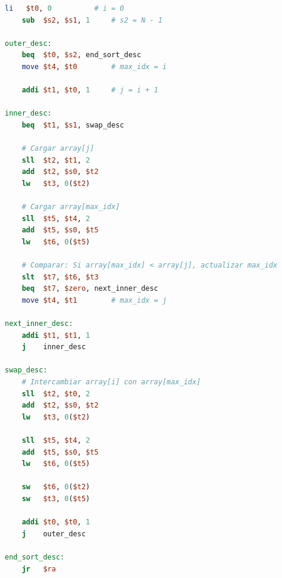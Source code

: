 \documentclass[12pt,a4paper]{article}
\begin{document}
\begin{lstlisting}[language=MIPS, caption={Programa en MIPS para almacenamiento, impresión y ordenamiento ascendente/descendente de un arreglo de 8 enteros.}, label={lst:mips_code}]
    li   $t0, 0          # i = 0
    sub  $s2, $s1, 1     # s2 = N - 1

outer_desc:
    beq  $t0, $s2, end_sort_desc
    move $t4, $t0        # max_idx = i

    addi $t1, $t0, 1     # j = i + 1

inner_desc:
    beq  $t1, $s1, swap_desc

    # Cargar array[j]
    sll  $t2, $t1, 2
    add  $t2, $s0, $t2
    lw   $t3, 0($t2)

    # Cargar array[max_idx]
    sll  $t5, $t4, 2
    add  $t5, $s0, $t5
    lw   $t6, 0($t5)

    # Comparar: Si array[max_idx] < array[j], actualizar max_idx
    slt  $t7, $t6, $t3
    beq  $t7, $zero, next_inner_desc
    move $t4, $t1        # max_idx = j

next_inner_desc:
    addi $t1, $t1, 1
    j    inner_desc

swap_desc:
    # Intercambiar array[i] con array[max_idx]
    sll  $t2, $t0, 2
    add  $t2, $s0, $t2
    lw   $t3, 0($t2)

    sll  $t5, $t4, 2
    add  $t5, $s0, $t5
    lw   $t6, 0($t5)

    sw   $t6, 0($t2)
    sw   $t3, 0($t5)

    addi $t0, $t0, 1
    j    outer_desc

end_sort_desc:
    jr   $ra
\end{lstlisting}
\end{document}
